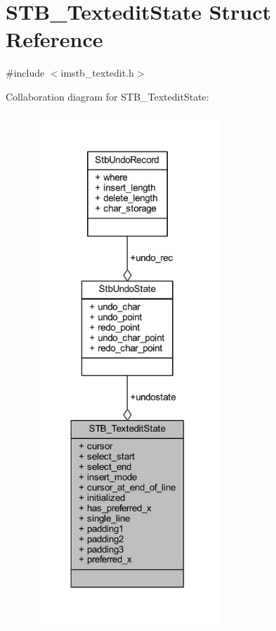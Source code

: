 \hypertarget{struct_s_t_b___textedit_state}{}\section{S\+T\+B\+\_\+\+Textedit\+State Struct Reference}
\label{struct_s_t_b___textedit_state}


{\ttfamily \#include $<$imstb\+\_\+textedit.\+h$>$}



Collaboration diagram for S\+T\+B\+\_\+\+Textedit\+State\+:
\nopagebreak
\begin{figure}[H]
\begin{center}
\leavevmode
\includegraphics[width=200pt]{struct_s_t_b___textedit_state__coll__graph}
\end{center}
\end{figure}
